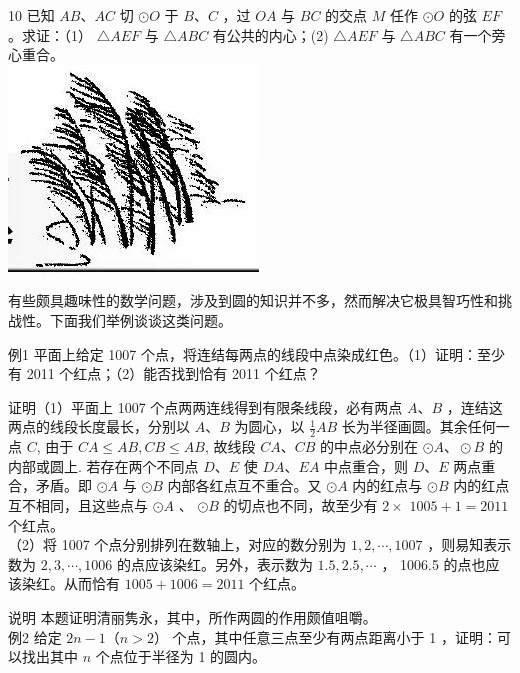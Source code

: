 \documentclass[10pt]{article}
\begin{document}
10 已知 $A B 、 A C$ 切 $\odot O$ 于 $B 、 C$ ，过 $O A$ 与 $B C$ 的交点 $M$ 任作 $\odot O$ 的弦 $E F$ 。求证：（1） $\triangle A E F$ 与 $\triangle A B C$ 有公共的内心；(2) $\triangle A E F$ 与 $\triangle A B C$ 有一个旁心重合。\\
\includegraphics[max width=\textwidth, center]{2024_10_30_66b8e5e701da2093c133g-080}

有些颇具趣味性的数学问题，涉及到圆的知识并不多，然而解决它极具智巧性和挑战性。下面我们举例谈谈这类问题。

例1 平面上给定 1007 个点，将连结每两点的线段中点染成红色。（1）证明：至少有 2011 个红点；（2）能否找到恰有 2011 个红点？

证明（1）平面上 1007 个点两两连线得到有限条线段，必有两点 $A 、 B$ ，连结这两点的线段长度最长，分别以 $A 、 B$ 为圆心，以 $\frac{1}{2} A B$ 长为半径画圆。其余任何一点 $C$, 由于 $C A \leqslant A B, C B \leqslant A B$, 故线段 $C A 、 C B$ 的中点必分别在 $\odot A 、 \odot B$ 的内部或圆上. 若存在两个不同点 $D 、 E$ 使 $D A 、 E A$ 中点重合，则 $D 、 E$ 两点重合，矛盾。即 $\odot A$ 与 $\odot B$ 内部各红点互不重合。又 $\odot A$ 内的红点与 $\odot B$ 内的红点互不相同，且这些点与 $\odot A$ 、 $\odot B$ 的切点也不同，故至少有 $2 \times$ $1005+1=2011$ 个红点。\\
（2）将 1007 个点分别排列在数轴上，对应的数分别为 $1,2, \cdots, 1007$ ，则易知表示数为 $2,3, \cdots, 1006$ 的点应该染红。另外，表示数为 $1.5,2.5, \cdots$ ， 1006.5 的点也应该染红。从而恰有 $1005+1006=2011$ 个红点。

说明 本题证明清丽隽永，其中，所作两圆的作用颇值咀嚼。\\
例2 给定 $2 n-1（n>2）$ 个点，其中任意三点至少有两点距离小于 1 ，证明：可以找出其中 $n$ 个点位于半径为 1 的圆内。
\end{document}
